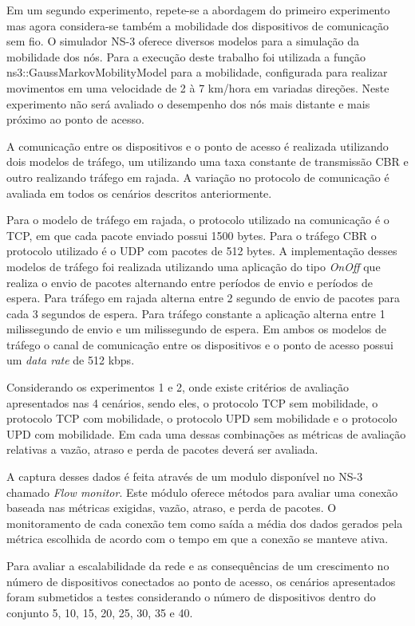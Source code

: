 \documentclass[12pt]{article}
\begin{document}
Em um segundo experimento, repete-se a abordagem do primeiro experimento mas agora considera-se também a mobilidade dos dispositivos de comunicação sem fio. O simulador NS-3 oferece diversos modelos para a simulação da mobilidade dos nós. Para a execução deste trabalho foi utilizada a função ns3::GaussMarkovMobilityModel para a mobilidade, configurada para realizar movimentos em uma velocidade de 2 à 7 km/hora em variadas direções. Neste experimento não será avaliado o desempenho dos nós mais distante e mais próximo ao ponto de acesso.

A comunicação entre os dispositivos e o ponto de acesso é realizada utilizando dois modelos de tráfego, um utilizando uma taxa constante de transmissão CBR e outro realizando tráfego em rajada. A variação no protocolo de comunicação é avaliada em todos os cenários descritos anteriormente.

Para o modelo de tráfego em rajada, o protocolo utilizado na comunicação é o TCP, em que cada pacote enviado possui 1500 bytes. Para o tráfego CBR o protocolo utilizado é o UDP com pacotes de 512 bytes. A implementação desses modelos de tráfego foi realizada utilizando uma aplicação do tipo \textit{OnOff} que realiza o envio de pacotes alternando entre períodos de envio e períodos de espera. Para tráfego em rajada alterna entre 2 segundo de envio de pacotes para cada 3 segundos de espera. Para tráfego constante a aplicação alterna entre 1 milissegundo de envio e um milissegundo de espera. Em ambos os modelos de tráfego o canal de comunicação entre os dispositivos e o ponto de acesso possui um \textit{data rate} de 512 kbps.

Considerando os experimentos 1 e 2, onde existe critérios de avaliação apresentados nas 4 cenários, sendo eles, o protocolo TCP sem mobilidade, o protocolo TCP com mobilidade, o protocolo UPD sem mobilidade e o protocolo UPD com mobilidade. Em cada uma dessas combinações as métricas de avaliação relativas a vazão, atraso e perda de pacotes deverá ser avaliada.

A captura desses dados é feita através de um modulo disponível no NS-3 chamado \textit{Flow monitor}. Este módulo oferece métodos para avaliar uma conexão baseada nas métricas exigidas, vazão, atraso, e perda de pacotes. O monitoramento de cada conexão tem como saída a média dos dados gerados pela métrica escolhida de acordo com o tempo em que a conexão se manteve ativa.

Para avaliar a escalabilidade da rede e as consequências de um crescimento no número de dispositivos conectados ao ponto de acesso, os cenários apresentados foram submetidos a testes considerando o número de dispositivos dentro do conjunto 5, 10, 15, 20, 25, 30, 35 e 40.
\end{document}
